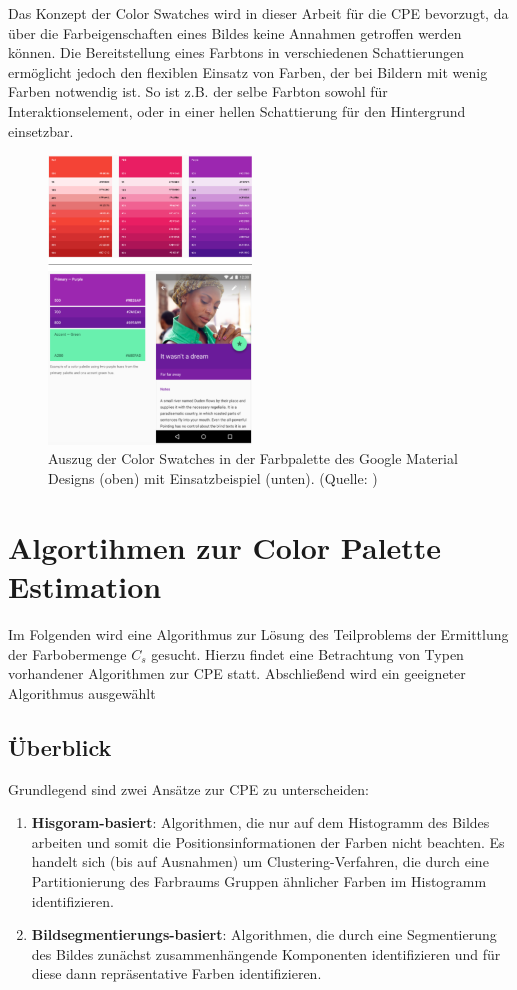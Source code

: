 \documentclass[11pt,a4paper,bibliography=totoc,twocolumn]{scrartcl}
\begin{document}
Das Konzept der Color Swatches wird in dieser Arbeit für die CPE bevorzugt, da über die Farbeigenschaften eines Bildes keine Annahmen getroffen werden können. Die Bereitstellung eines Farbtons in verschiedenen Schattierungen ermöglicht jedoch den flexiblen Einsatz von Farben, der bei Bildern mit wenig Farben notwendig ist. So ist z.B. der selbe Farbton sowohl für Interaktionselement, oder in einer hellen Schattierung für den Hintergrund einsetzbar. 

\begin{figure}[h]
	\centering
	\includegraphics[width=0.48\textwidth]{img/material_design.png}
	\caption{Auszug der Color Swatches in der Farbpalette des Google Material Designs (oben) mit Einsatzbeispiel (unten). (Quelle: \citep{google})}
	\label{fig:swatches}
\end{figure}

\section{Algortihmen zur Color Palette Estimation}

Im Folgenden wird eine Algorithmus zur Lösung des Teilproblems der Ermittlung der Farbobermenge $C_s$ gesucht. Hierzu findet eine Betrachtung von Typen vorhandener Algorithmen zur CPE statt. Abschließend wird ein geeigneter Algorithmus ausgewählt

\subsection{Überblick}

Grundlegend sind zwei Ansätze zur CPE zu unterscheiden:
\begin{enumerate}
    \item \textbf{Hisgoram-basiert}: Algorithmen, die nur auf dem Histogramm des Bildes arbeiten und somit die Positionsinformationen der Farben nicht beachten. Es handelt sich (bis auf Ausnahmen) um Clustering-Verfahren, die durch eine Partitionierung des Farbraums Gruppen ähnlicher Farben im Histogramm identifizieren.
    \item \textbf{Bildsegmentierungs-basiert}: Algorithmen, die durch eine Segmentierung des Bildes zunächst zusammenhängende Komponenten identifizieren und für diese dann repräsentative Farben identifizieren.
\end{enumerate}
\end{document}
